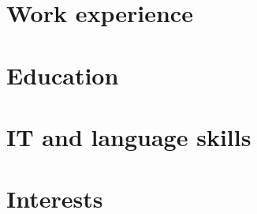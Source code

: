 




\maketitle
\vspace{-1cm}

\section{Work experience}
	

\section{Education}
	
	
\section{IT and language skills}
	

\section{Interests}
	

%	

